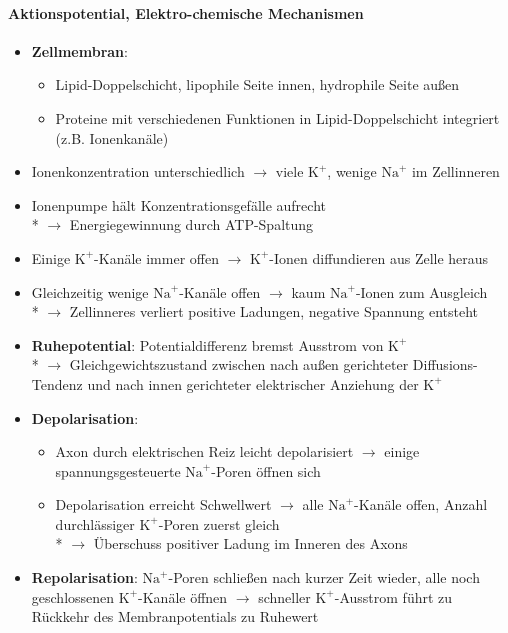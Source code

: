 \paragraph{Aktionspotential, Elektro-chemische Mechanismen}
\begin{itemize}
  \item \textbf{Zellmembran}:
  \begin{itemize}
    \item Lipid-Doppelschicht, lipophile Seite innen, hydrophile Seite außen
    \item Proteine mit verschiedenen Funktionen in Lipid-Doppelschicht integriert (z.B. Ionenkanäle)
  \end{itemize}
  \item Ionenkonzentration unterschiedlich \( \to \) viele \( \text{K}^+ \), wenige \( \text{Na}^+ \) im Zellinneren
  \item Ionenpumpe hält Konzentrationsgefälle aufrecht \\* \( \to \) Energiegewinnung durch ATP-Spaltung
  \item Einige \( \text{K}^+ \)-Kanäle immer offen \( \to \) \( \text{K}^+ \)-Ionen diffundieren aus Zelle heraus
  \item Gleichzeitig wenige \( \text{Na}^+ \)-Kanäle offen \( \to \) kaum \( \text{Na}^+ \)-Ionen zum Ausgleich \\* \( \to \) Zellinneres verliert positive Ladungen, negative Spannung entsteht
  \item \textbf{Ruhepotential}: Potentialdifferenz bremst Ausstrom von \( \text{K}^+ \) \\* \( \to \) Gleichgewichtszustand zwischen nach außen gerichteter Diffusions-Tendenz und nach innen gerichteter elektrischer Anziehung der \( \text{K}^+ \)
  \item \textbf{Depolarisation}:
  \begin{itemize}
    \item Axon durch elektrischen Reiz leicht depolarisiert \( \to \) einige spannungsgesteuerte \( \text{Na}^+ \)-Poren öffnen sich
    \item Depolarisation erreicht Schwellwert \( \to \) alle \( \text{Na}^+ \)-Kanäle offen, Anzahl durchlässiger \( \text{K}^+ \)-Poren zuerst gleich \\* \( \to \) Überschuss positiver Ladung im Inneren des Axons
  \end{itemize}
  \item \textbf{Repolarisation}: \( \text{Na}^+ \)-Poren schließen nach kurzer Zeit wieder, alle noch geschlossenen \( \text{K}^+ \)-Kanäle öffnen \( \to \) schneller \( \text{K}^+ \)-Ausstrom führt zu Rückkehr des Membranpotentials zu Ruhewert
\end{itemize}

